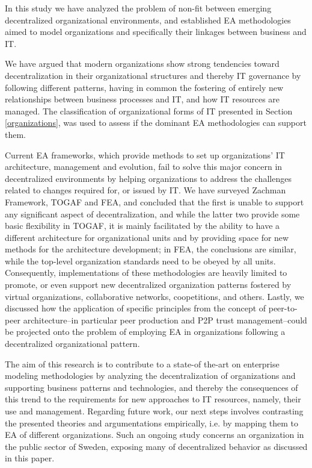 In this study we have analyzed the problem of non-fit between emerging decentralized organizational environments, and established EA methodologies aimed to model organizations and specifically their linkages between business and IT. 

We have argued that modern organizations show strong tendencies toward decentralization in their organizational structures and thereby IT governance by following different patterns, having in common the fostering of entirely new relationships between business processes and IT, and how IT resources are managed. The classification of organizational forms of IT presented in Section \ref{organizations}, was used to assess if the dominant EA methodologies can support them.

Current EA frameworks, which provide methods to set up organizations' IT architecture, management and evolution, fail to solve this major concern in decentralized environments by helping organizations to address the challenges related  to changes required for, or issued by IT. We have surveyed Zachman Framework, TOGAF and FEA, and concluded that the first is unable to support any significant aspect of decentralization, and while the latter two provide some basic flexibility in TOGAF, it is mainly facilitated by the ability to have a different architecture for organizational units and by providing space for new methods for the architecture development; in FEA, the conclusions are similar,  while the top-level organization  standards need to be obeyed by all units. Consequently, implementations of these methodologies are heavily limited to promote, or even support new decentralized organization patterns fostered by virtual organizations, collaborative networks, coopetitions, and others. Lastly, we discussed how the application of specific principles from the concept of peer-to-peer architecture--in particular peer production and P2P trust management--could be projected onto the problem of employing EA in organizations following a decentralized organizational pattern.


The aim of this research is to contribute to a state-of the-art on enterprise modeling methodologies by analyzing the decentralization of organizations and supporting business patterns and technologies, and thereby the consequences of this trend to the requirements  for new approaches  to IT resources,  namely, their use and management. Regarding future work, our next steps involves contrasting the presented theories and argumentations empirically, i.e. by mapping them to EA of different organizations.  Such an ongoing study concerns an organization in the public sector of Sweden, exposing many of decentralized behavior as discussed in this paper.